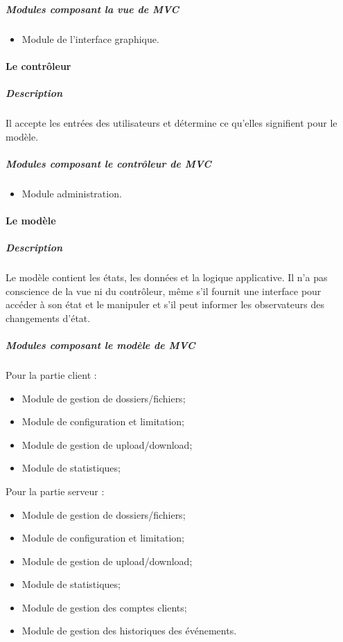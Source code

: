 \documentclass[10pt,a4paper]{report}
\begin{document}
			\subparagraph{Modules composant la vue de MVC}
			\begin{flushleft}
				\begin{itemize}
				 	\item Module de l'interface graphique.
				\end{itemize}
			\end{flushleft}
			
		\paragraph{Le contrôleur}
			\subparagraph{Description}
			\begin{flushleft}
				Il accepte les entrées des utilisateurs et détermine ce qu’elles
signifient pour le modèle.
			\end{flushleft}
			
			\subparagraph{Modules composant le contrôleur de MVC}
			\begin{flushleft}
				\begin{itemize}
					\item Module administration.
				\end{itemize}
			\end{flushleft}
			
		\paragraph{Le modèle}
			\subparagraph{Description}
			\begin{flushleft}
				Le modèle contient les états, les données et la logique applicative. Il n’a pas conscience de la vue ni du contrôleur, même s’il fournit une interface pour accéder à son état et le manipuler et s’il peut informer les observateurs des changements d’état.
			\end{flushleft}
			
			\subparagraph{Modules composant le modèle de MVC}
			\begin{flushleft}
			Pour la partie client :
				\begin{itemize}
					\item Module de gestion de dossiers/fichiers;
					\item Module de configuration et limitation;
					\item Module de gestion de upload/download;
					\item Module de statistiques;
				\end{itemize}
			Pour la partie serveur :
			\begin{itemize}
					\item Module de gestion de dossiers/fichiers;
					\item Module de configuration et limitation;
					\item Module de gestion de upload/download;
					\item Module de statistiques;
					\item Module de gestion des comptes clients;
					\item Module de gestion des historiques des événements.
				\end{itemize}
			\end{flushleft}
\end{document}
